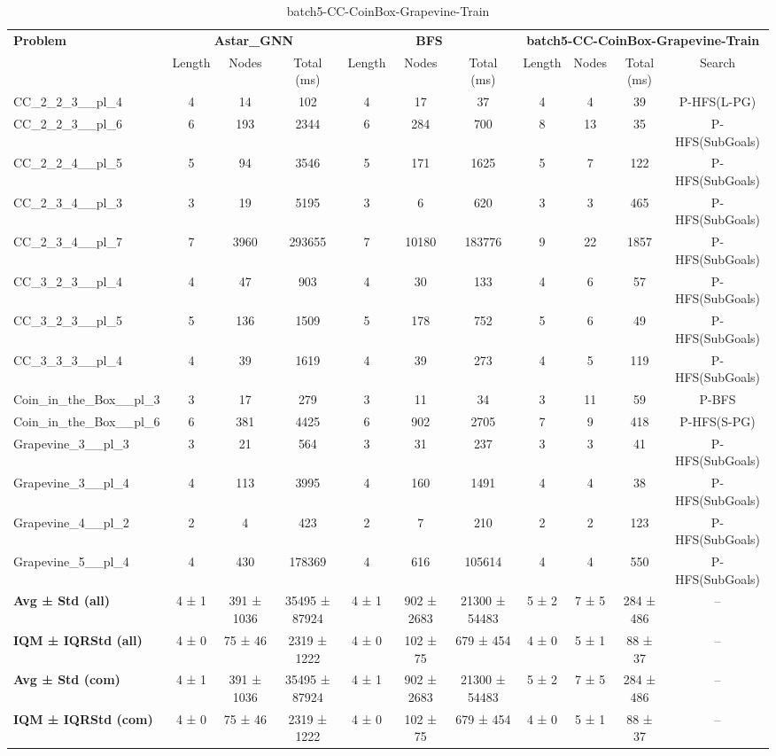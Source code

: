 \begin{table}[!ht]
\centering
\scriptsize
\begin{tabular}{l|ccc|ccc|cccc}
\multirow{2}{*}{\textbf{Problem}} & \multicolumn{3}{c|}{\textbf{Astar\_GNN}} & \multicolumn{3}{c|}{\textbf{BFS}} & \multicolumn{4}{c}{\textbf{batch5-CC-CoinBox-Grapevine-Train}} \\
\cline{2-11}
& Length & Nodes & Total (ms) & Length & Nodes & Total (ms) & Length & Nodes & Total (ms) & Search \\
\hline
CC\_2\_2\_3\_\_pl\_4 & 4 & 14 & 102 & 4 & 17 & 37 & 4 & 4 & 39 & P-HFS(L-PG) \\
CC\_2\_2\_3\_\_pl\_6 & 6 & 193 & 2344 & 6 & 284 & 700 & 8 & 13 & 35 & P-HFS(SubGoals) \\
CC\_2\_2\_4\_\_pl\_5 & 5 & 94 & 3546 & 5 & 171 & 1625 & 5 & 7 & 122 & P-HFS(SubGoals) \\
CC\_2\_3\_4\_\_pl\_3 & 3 & 19 & 5195 & 3 & 6 & 620 & 3 & 3 & 465 & P-HFS(SubGoals) \\
CC\_2\_3\_4\_\_pl\_7 & 7 & 3960 & 293655 & 7 & 10180 & 183776 & 9 & 22 & 1857 & P-HFS(SubGoals) \\
CC\_3\_2\_3\_\_pl\_4 & 4 & 47 & 903 & 4 & 30 & 133 & 4 & 6 & 57 & P-HFS(SubGoals) \\
CC\_3\_2\_3\_\_pl\_5 & 5 & 136 & 1509 & 5 & 178 & 752 & 5 & 6 & 49 & P-HFS(SubGoals) \\
CC\_3\_3\_3\_\_pl\_4 & 4 & 39 & 1619 & 4 & 39 & 273 & 4 & 5 & 119 & P-HFS(SubGoals) \\
Coin\_in\_the\_Box\_\_pl\_3 & 3 & 17 & 279 & 3 & 11 & 34 & 3 & 11 & 59 & P-BFS \\
Coin\_in\_the\_Box\_\_pl\_6 & 6 & 381 & 4425 & 6 & 902 & 2705 & 7 & 9 & 418 & P-HFS(S-PG) \\
Grapevine\_3\_\_pl\_3 & 3 & 21 & 564 & 3 & 31 & 237 & 3 & 3 & 41 & P-HFS(SubGoals) \\
Grapevine\_3\_\_pl\_4 & 4 & 113 & 3995 & 4 & 160 & 1491 & 4 & 4 & 38 & P-HFS(SubGoals) \\
Grapevine\_4\_\_pl\_2 & 2 & 4 & 423 & 2 & 7 & 210 & 2 & 2 & 123 & P-HFS(SubGoals) \\
Grapevine\_5\_\_pl\_4 & 4 & 430 & 178369 & 4 & 616 & 105614 & 4 & 4 & 550 & P-HFS(SubGoals) \\
\hline
\textbf{Avg ± Std (all)} & 4 ± 1 & 391 ± 1036 & 35495 ± 87924 & 4 ± 1 & 902 ± 2683 & 21300 ± 54483 & 5 ± 2 & 7 ± 5 & 284 ± 486 & -- \\
\textbf{IQM ± IQRStd (all)} & 4 ± 0 & 75 ± 46 & 2319 ± 1222 & 4 ± 0 & 102 ± 75 & 679 ± 454 & 4 ± 0 & 5 ± 1 & 88 ± 37 & -- \\
\textbf{Avg ± Std (com)} & 4 ± 1 & 391 ± 1036 & 35495 ± 87924 & 4 ± 1 & 902 ± 2683 & 21300 ± 54483 & 5 ± 2 & 7 ± 5 & 284 ± 486 & -- \\
\textbf{IQM ± IQRStd (com)} & 4 ± 0 & 75 ± 46 & 2319 ± 1222 & 4 ± 0 & 102 ± 75 & 679 ± 454 & 4 ± 0 & 5 ± 1 & 88 ± 37 & -- \\
\end{tabular}
\caption{batch5-CC-CoinBox-Grapevine-Train}
\label{tab:batch5_CC-CoinBox-Grapevine_comparison_train}
\end{table}

